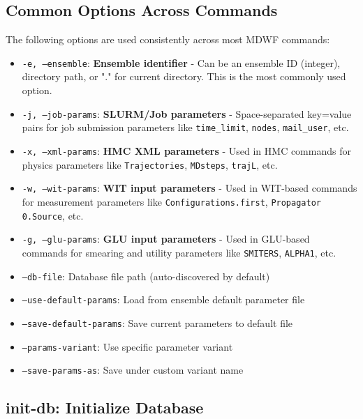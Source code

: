 \documentclass{article}
\begin{document}
\subsection{Common Options Across Commands}

The following options are used consistently across most MDWF commands:

\begin{itemize}
\item \texttt{-e, --ensemble}: \textbf{Ensemble identifier} - Can be an ensemble ID (integer), directory path, or "." for current directory. This is the most commonly used option.

\item \texttt{-j, --job-params}: \textbf{SLURM/Job parameters} - Space-separated key=value pairs for job submission parameters like \texttt{time\_limit}, \texttt{nodes}, \texttt{mail\_user}, etc.

\item \texttt{-x, --xml-params}: \textbf{HMC XML parameters} - Used in HMC commands for physics parameters like \texttt{Trajectories}, \texttt{MDsteps}, \texttt{trajL}, etc.

\item \texttt{-w, --wit-params}: \textbf{WIT input parameters} - Used in WIT-based commands for measurement parameters like \texttt{Configurations.first}, \texttt{Propagator 0.Source}, etc.

\item \texttt{-g, --glu-params}: \textbf{GLU input parameters} - Used in GLU-based commands for smearing and utility parameters like \texttt{SMITERS}, \texttt{ALPHA1}, etc.

\item \texttt{--db-file}: Database file path (auto-discovered by default)
\item \texttt{--use-default-params}: Load from ensemble default parameter file
\item \texttt{--save-default-params}: Save current parameters to default file
\item \texttt{--params-variant}: Use specific parameter variant
\item \texttt{--save-params-as}: Save under custom variant name
\end{itemize}







\subsection{init-db: Initialize Database}
\end{document}
